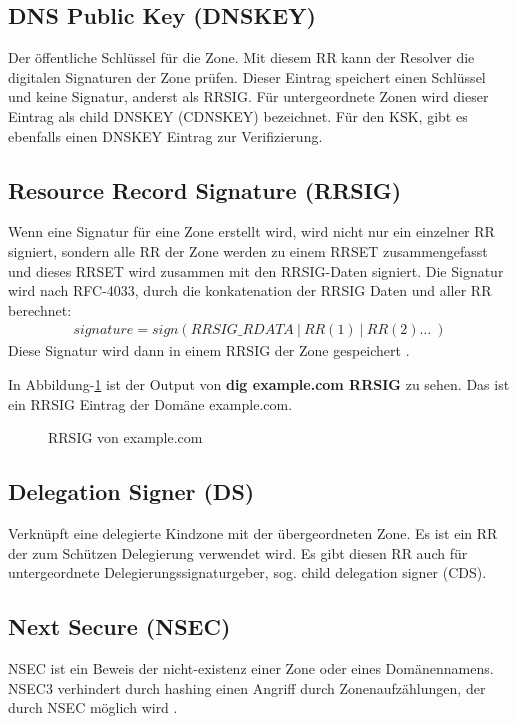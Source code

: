 \subsection{DNS Public Key (DNSKEY)}
Der öffentliche Schlüssel für die Zone. Mit diesem RR kann der Resolver die digitalen Signaturen der Zone prüfen.
Dieser Eintrag speichert einen Schlüssel und keine Signatur, anderst als RRSIG.
Für untergeordnete Zonen wird dieser Eintrag als child DNSKEY (CDNSKEY) bezeichnet.
Für den KSK, gibt es ebenfalls einen DNSKEY Eintrag zur Verifizierung.

\subsection{Resource Record Signature (RRSIG)}
Wenn eine Signatur für eine Zone erstellt wird, wird nicht nur ein einzelner RR signiert, sondern alle RR der Zone werden zu einem RRSET zusammengefasst und dieses RRSET wird zusammen mit den RRSIG-Daten signiert.
Die Signatur wird nach RFC-4033, durch die konkatenation der RRSIG Daten und aller RR berechnet:
\begin{align*}
    signature = sign(RRSIG\_RDATA\ |\ RR(1)\ |\ RR(2)\ldots\ )
\end{align*}
Diese Signatur wird dann in einem RRSIG der Zone gespeichert \cite{ietf-rfc-4033,WhatAreRRSETs2026}.

In Abbildung-\ref{fig:rrsig} ist der Output von \textbf{dig example.com RRSIG} zu sehen. Das ist ein RRSIG Eintrag der Domäne example.com.

\begin{figure}[htbp]
    
    \caption{RRSIG von example.com}
    \label{fig:rrsig}
\end{figure}

\subsection{Delegation Signer (DS)}
Verknüpft eine delegierte Kindzone mit der übergeordneten Zone.
Es ist ein RR der zum Schützen Delegierung verwendet wird.
Es gibt diesen RR auch für untergeordnete Delegierungssignaturgeber, sog. child delegation signer (CDS).
\subsection{Next Secure (NSEC)}
NSEC ist ein Beweis der nicht-existenz einer Zone oder eines Domänennamens.
NSEC3 verhindert durch hashing einen Angriff durch Zonenaufzählungen, der durch NSEC möglich wird
\cite{ietf-rfc-4033,ietf-rfc-4034,ietf-rfc-4035,asudbringUebersichtUeberDNSSEC,HowDoesDNSSEC}.

